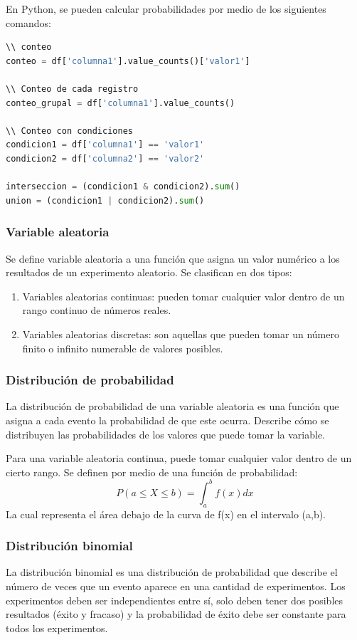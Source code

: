 \documentclass[a4paper, 12pt]{book}
\begin{document}
En Python, se pueden calcular probabilidades por medio de los siguientes comandos:
\begin{lstlisting}[language=Python]
\\ conteo
conteo = df['columna1'].value_counts()['valor1']

\\ Conteo de cada registro
conteo_grupal = df['columna1'].value_counts()

\\ Conteo con condiciones
condicion1 = df['columna1'] == 'valor1'
condicion2 = df['columna2'] == 'valor2'

interseccion = (condicion1 & condicion2).sum()
union = (condicion1 | condicion2).sum()
\end{lstlisting}

\subsubsection{Variable aleatoria}
Se define variable aleatoria a una función que asigna un valor numérico a los resultados de un experimento aleatorio. Se clasifican en dos tipos:
\begin{enumerate}
	\item Variables aleatorias continuas: pueden tomar cualquier valor dentro de un rango continuo de números reales.
	\item Variables aleatorias discretas: son aquellas que pueden tomar un número finito o infinito numerable de valores posibles.
\end{enumerate}

\subsubsection{Distribución de probabilidad}
La distribución de probabilidad de una variable aleatoria es una función que asigna a cada evento la probabilidad de que este ocurra. Describe cómo se distribuyen las probabilidades de los valores que puede tomar la variable.

Para una variable aleatoria continua, puede tomar cualquier valor dentro de un cierto rango. Se definen por medio de una función de probabilidad:
\begin{equation}
	P(a \leqslant X \leqslant b) = \int_{a}^{b} f(x)dx
\end{equation}
La cual representa el área debajo de la curva de f(x) en el intervalo (a,b).

\subsubsection{Distribución binomial}
La distribución binomial es una distribución de probabilidad que describe el número de veces que un evento aparece en una cantidad de experimentos. Los experimentos deben ser independientes entre sí, solo deben tener dos posibles resultados (éxito y fracaso) y la probabilidad de éxito debe ser constante para todos los experimentos.
\end{document}
